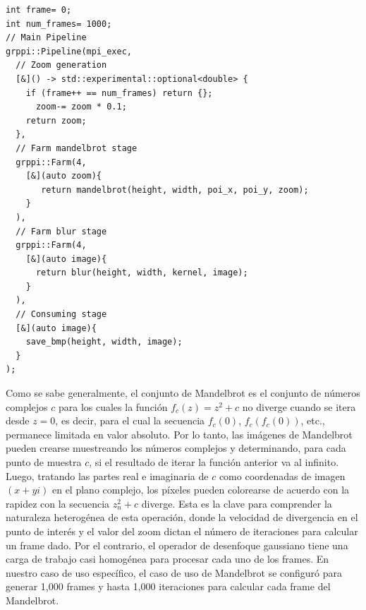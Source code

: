 \vspace{0.35cm}
\begin{lstlisting}[linewidth=1\columnwidth,caption={Implementación Mandelbrot en Boost \acrshort{mpi}.},label=lst:mpimandelcode,frame=single]
int frame= 0;
int num_frames= 1000;
// Main Pipeline
grppi::Pipeline(mpi_exec,
  // Zoom generation
  [&]() -> std::experimental::optional<double> {
    if (frame++ == num_frames) return {};
      zoom-= zoom * 0.1;
    return zoom;
  },
  // Farm mandelbrot stage
  grppi::Farm(4,
    [&](auto zoom){
       return mandelbrot(height, width, poi_x, poi_y, zoom);
    }
  ),
  // Farm blur stage
  grppi::Farm(4,
    [&](auto image){
      return blur(height, width, kernel, image);
    }
  ), 
  // Consuming stage
  [&](auto image){
    save_bmp(height, width, image);
  }
);
\end{lstlisting}
\vspace{0.35cm}

Como se sabe generalmente, el conjunto de Mandelbrot es el conjunto de números complejos $c$ para los cuales la función $f_{c}(z)=z^{2}+c$ no diverge cuando se itera desde $z=0$, es decir, para el cual la secuencia $f_{c}(0)$, $f_{c}(f_{c}(0))$, etc., permanece limitada en valor absoluto. Por lo tanto, las imágenes de Mandelbrot pueden crearse muestreando los números complejos y determinando, para cada punto de muestra $c$, si el resultado de iterar la función anterior va al infinito. Luego, tratando las partes real e imaginaria de $c$ como coordenadas de imagen $(x+yi)$ en el plano complejo, los píxeles pueden colorearse de acuerdo con la rapidez con la secuencia $z_{n}^{2}+c$ diverge. Esta es la clave para comprender la naturaleza heterogénea de esta operación, donde la velocidad de divergencia en el punto de interés y el valor del zoom dictan el número de iteraciones para calcular un frame dado. Por el contrario, el operador de desenfoque gaussiano tiene una carga de trabajo casi homogénea para procesar cada uno de los frames. En nuestro caso de uso específico, el caso de uso de Mandelbrot se configuró para generar 1,000 frames y hasta 1,000 iteraciones para calcular cada frame del Mandelbrot.

